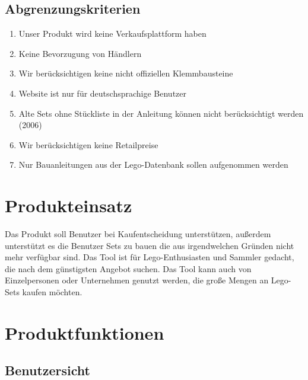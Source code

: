 \subsection{Abgrenzungskriterien}
\begin{enumerate}
\item Unser Produkt wird keine Verkaufsplattform haben
\item Keine Bevorzugung von Händlern
\item Wir berücksichtigen keine nicht offiziellen Klemmbausteine
\item Website ist nur für deutschsprachige Benutzer
\item Alte Sets ohne Stückliste in der Anleitung können nicht berücksichtigt werden (2006)
\item Wir berücksichtigen keine Retailpreise
\item Nur Bauanleitungen aus der Lego-Datenbank sollen aufgenommen werden
\end{enumerate}

\section{Produkteinsatz}
 Das Produkt soll Benutzer bei Kaufentscheidung unterstützen, außerdem unterstützt es die Benutzer Sets zu bauen die aus irgendwelchen Gründen nicht mehr verfügbar sind.\newline
Das Tool ist für Lego-Enthusiasten und Sammler gedacht, die nach dem günstigsten Angebot suchen. Das Tool kann auch von Einzelpersonen oder Unternehmen genutzt werden, die große Mengen an Lego-Sets kaufen möchten. \newline

\section{Produktfunktionen}

\subsection{Benutzersicht}

